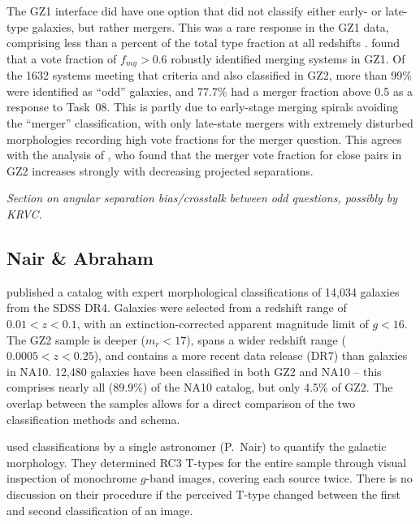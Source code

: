 \documentclass[useAMS,usenatbib]{mn2e}
\begin{document}
The GZ1 interface did have one option that did not classify either early- or late-type galaxies, but rather mergers. This was a rare response in the GZ1 data, comprising less than a percent of the total type fraction at all redshifts \citep{bam09}. \citet{dar10a} found that a vote fraction of $f_{mg} > 0.6$ robustly identified merging systems in GZ1. Of the 1632 systems meeting that criteria and also classified in GZ2, more than 99\% were identified as ``odd'' galaxies, and 77.7\% had a merger fraction above 0.5 as a response to Task~08. This is partly due to early-stage merging spirals avoiding the ``merger'' classification, with only late-state mergers with extremely disturbed morphologies recording high vote fractions for the merger question. This agrees with the analysis of \citet{cas13}, who found that the merger vote fraction for close pairs in GZ2 increases strongly with decreasing projected separations. 

{\it Section on angular separation bias/crosstalk between odd questions, possibly by KRVC.}

\subsection{Nair \& Abraham}

\citet[][hereafter NA10]{nai10} published a catalog with expert morphological classifications of 14,034 galaxies from the SDSS DR4. Galaxies were selected from a redshift range of $0.01<z<0.1$, with an extinction-corrected apparent magnitude limit of $g<16$. The GZ2 sample is deeper ($m_r<17$), spans a wider redshift range ($0.0005<z<0.25$), and contains a more recent data release (DR7) than galaxies in NA10. 12,480 galaxies have been classified in both GZ2 and NA10 -- this comprises nearly all (89.9\%) of the NA10 catalog, but only 4.5\% of GZ2. The overlap between the samples allows for a direct comparison of the two classification methods and schema.  

\citet{nai10} used classifications by a single astronomer (P.~Nair) to quantify the galactic morphology. They determined RC3 T-types \citep[a numerical index of a galaxy's stage along the Hubble sequence;][]{dev91} for the entire sample through visual inspection of monochrome $g$-band images, covering each source twice. There is no discussion on their procedure if the perceived T-type changed between the first and second classification of an image. 
\end{document}
